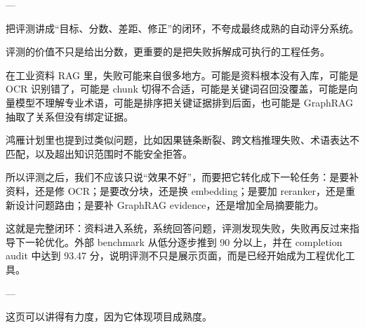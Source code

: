 \documentclass[10pt, a4paper]{ctexart}
\begin{document}
\begin{tcolorbox}[colback=white, colframe=primary!35, title={\textbf{第 16 页：评测平台让项目从能演示变成能评分}}, beforeafter skip=2.0pt]
\begin{minipage}[t]{0.72\textwidth}
---
\end{minipage}
\hfill
\begin{minipage}[t]{0.25\textwidth}
  \fontsize{7.5}{9.5}\selectfont
  \begin{tcolorbox}[colback=orange!5, colframe=orange!45, title=\textbf{讲述重点}, left=0.6mm, right=0.6mm, top=0.8mm, bottom=0.8mm, arc=0.8mm, boxrule=0.4pt, beforeafter skip=0pt]
    把评测讲成“目标、分数、差距、修正”的闭环，不夸成最终成熟的自动评分系统。
  \end{tcolorbox}
\end{minipage}
\end{tcolorbox}

\begin{tcolorbox}[colback=white, colframe=primary!35, title={\textbf{第 17 页：失败归因把问题变成优化路线图}}, beforeafter skip=2.0pt]
\begin{minipage}[t]{0.72\textwidth}
  \linespread{1.0}\selectfont\footnotesize
  评测的价值不只是给出分数，更重要的是把失败拆解成可执行的工程任务。

在工业资料 RAG 里，失败可能来自很多地方。可能是资料根本没有入库，可能是 OCR 识别错了，可能是 chunk 切得不合适，可能是关键词召回没覆盖，可能是向量模型不理解专业术语，可能是排序把关键证据排到后面，也可能是 GraphRAG 抽取了关系但没有绑定证据。

鸿雁计划里也提到过类似问题，比如因果链条断裂、跨文档推理失败、术语表达不匹配，以及超出知识范围时不能安全拒答。

所以评测之后，我们不应该只说“效果不好”，而要把它转化成下一轮任务：是要补资料，还是修 OCR；是要改分块，还是换 embedding；是要加 reranker，还是重新设计问题路由；是要补 GraphRAG evidence，还是增加全局摘要能力。

这就是完整闭环：资料进入系统，系统回答问题，评测发现失败，失败再反过来指导下一轮优化。外部 benchmark 从低分逐步推到 90 分以上，并在 completion audit 中达到 93.47 分，说明评测不只是展示页面，而是已经开始成为工程优化工具。

---
\end{minipage}
\hfill
\begin{minipage}[t]{0.25\textwidth}
  \fontsize{7.5}{9.5}\selectfont
  \begin{tcolorbox}[colback=orange!5, colframe=orange!45, title=\textbf{讲述重点}, left=0.6mm, right=0.6mm, top=0.8mm, bottom=0.8mm, arc=0.8mm, boxrule=0.4pt, beforeafter skip=0pt]
    这页可以讲得有力度，因为它体现项目成熟度。
  \end{tcolorbox}
\end{minipage}
\end{tcolorbox}
\end{document}
